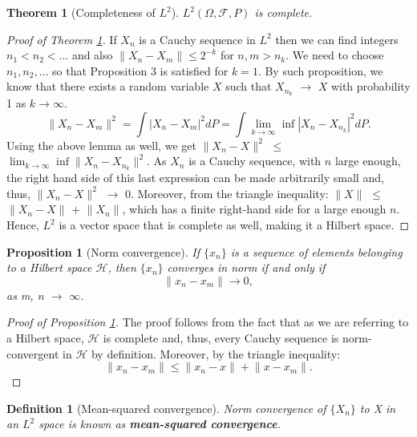 \documentclass{article}
\newtheorem{defn}{Definition}
\newtheorem{prop}{Proposition}
\newtheorem{thm}{Theorem}
\begin{document}
\begin{thm}[Completeness of $L^2$]\label{thm:l2c}
$L^2(\Omega, \mathscr{F}, P)$ is complete.
\end{thm}

\begin{proof}[Proof of Theorem \ref{thm:l2c}]
If ${X_n}$ is a Cauchy sequence in $L^2$ then we can find integers $n_1<n_2<...$ and also $\lVert X_n - X_m \rVert \leqslant 2^{-k}$ for $n, m > n_k$. We need to choose $n_1, n_2, ...$ so that Proposition 3 is satisfied for $k=1$.
By such proposition, we know that there exists a random variable $X$ such that $X_{n_k}$ $\rightarrow$ $X$ with probability 1 as $k\rightarrow \infty$. 
\[
\lVert X_n - X_m \rVert^2 = \int \left| X_n - X_m \right|^2 dP = \int \lim_{k\to\infty} \inf \left| X_n - X_{n_k} \right|^2 dP.
\]
Using the above lemma as well, we get $\lVert X_n - X \rVert^2$ $\leqslant$ $\lim_{k\to\infty} \inf \lVert X_n - X_{n_k} \rVert^2$.
As ${X_n}$ is a Cauchy sequence, with $n$ large enough, the right hand side of this last expression can be made arbitrarily small and, thus, $\lVert X_n - X\rVert^2$ $\rightarrow$ 0.
Moreover, from the triangle inequality: $\lVert X \rVert$ $\leqslant$  $\lVert X_n - X \rVert$ + $\lVert X_n \rVert$, which has a finite right-hand side for a large enough $n$. Hence, $L^2$ is a vector space that is complete as well, making it a Hilbert space. \newline
\end{proof}

\begin{prop}[Norm convergence]\label{prop:nc}
 If $\{x_n\}$ is a sequence of elements belonging to a Hilbert space $\mathscr{H}$, then $\{x_n\}$ converges in norm if and only if 
\[
\lVert x_n - x_m \rVert \rightarrow 0,\] as m, n $\rightarrow$ $\infty$.
\end{prop}
 
\begin{proof}[Proof of Proposition \ref{prop:nc}]
The proof follows from the fact that as we are referring to a Hilbert space, $\mathscr{H}$ is complete and, thus, every Cauchy sequence is norm-convergent in $\mathscr{H}$ by definition. Moreover, by the triangle inequality:
\[
\lVert {x_n - x_m} \rVert \leqslant \lVert {x_n - x} \rVert + \lVert {x - x_m} \rVert.
\]
\end{proof}

\begin{defn}[Mean-squared convergence]
Norm convergence of $\{X_n\}$ to X in an $L^2$ space is known as \textbf{mean-squared convergence}. \newline
\end{defn}
\end{document}
